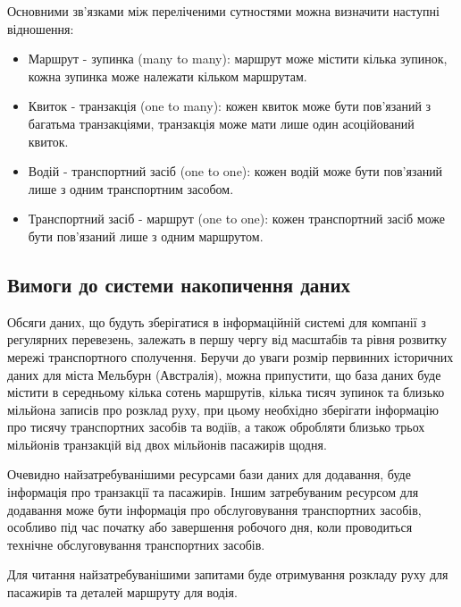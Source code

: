\documentclass[oneside,14pt]{extarticle}
\begin{document}
Основними зв'язками між переліченими сутностями можна визначити наступні відношення:
\begin{itemize}
\item Маршрут - зупинка (many to many): маршрут може містити кілька зупинок, кожна зупинка може належати кільком маршрутам.
\item Квиток - транзакція (one to many): кожен квиток може бути пов'язаний з багатьма транзакціями, транзакція може мати лише один асоційований квиток.
\item Водій - транспортний засіб (one to one): кожен водій може бути пов'язаний лише з одним транспортним засобом.
\item Транспортний засіб - маршрут (one to one): кожен транспортний засіб може бути пов'язаний лише з одним маршрутом.
\end{itemize}

\subsection{Вимоги до системи накопичення даних}
Обсяги даних, що будуть зберігатися в інформаційній системі для компанії з регулярних перевезень, залежать в першу чергу від масштабів та рівня розвитку мережі транспортного сполучення. Беручи до уваги розмір первинних історичних даних для міста Мельбурн (Австралія), можна припустити, що база даних буде містити в середньому кілька сотень маршрутів, кілька тисяч зупинок та близько мільйона записів про розклад руху, при цьому необхідно зберігати інформацію про тисячу транспортних засобів та водіїв, а також обробляти близько трьох мільйонів транзакцій від двох мільйонів пасажирів щодня.

Очевидно найзатребуванішими ресурсами бази даних для додавання, буде інформація про транзакції та пасажирів. Іншим затребуваним ресурсом для додавання може бути інформація про обслуговування транспортних засобів, особливо під час початку або завершення робочого дня, коли проводиться технічне обслуговування транспортних засобів.

Для читання найзатребуванішими запитами буде отримування розкладу руху для пасажирів та деталей маршруту для водія.
\end{document}
